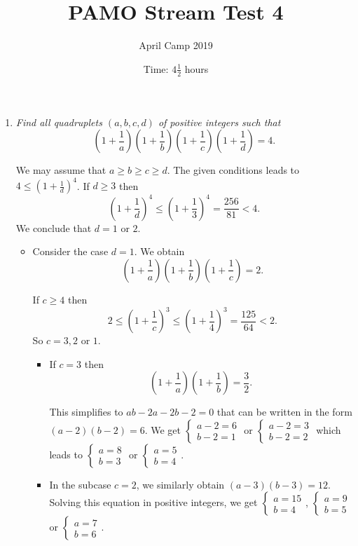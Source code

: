 \documentclass[a4paper, 12pt]{article}
\title{PAMO Stream Test 4}
\author{April Camp 2019}
\date{Time: $4 \frac{1}{2}$ hours}
\begin{document}
 \maketitle

\begin{enumerate}

\item {\itshape Find all quadruplets $(a, b, c, d)$ of positive integers such that
\[
    \left( 1 + \frac{1}{a} \right) \left( 1 + \frac{1}{b} \right) \left( 1 + \frac{1}{c} \right) \left( 1 + \frac{1}{d} \right) = 4.
\]}

We may assume that $a \geq b \geq c \geq d$. The given conditions leads to $4 \leq {\left( 1 + \frac{1}{d} \right)}^4$. If $d \geq 3$ then
\[
    {\left( 1 + \frac{1}{d} \right)}^4 \leq {\left( 1 + \frac{1}{3} \right)}^4 = \frac{256}{81} < 4.
\]
We conclude that $d = 1$ or $2$.

\begin{itemize}

\item Consider the case $d = 1$. We obtain
\[
    \left( 1 + \frac{1}{a} \right) \left( 1 + \frac{1}{b} \right) \left( 1 + \frac{1}{c} \right) = 2.
\]

If $c \geq 4$ then
\[
    2 \leq {\left( 1 + \frac{1}{c} \right)}^3 \leq {\left( 1 + \frac{1}{4} \right)}^3 = \frac{125}{64} < 2.
\]
So $c = 3, 2$ or $1$.
\begin{itemize}

\item If $c = 3$ then
\[
    \left( 1 + \frac{1}{a} \right) \left( 1 + \frac{1}{b} \right) = \frac{3}{2}.
\]

This simplifies to $ab - 2a - 2b - 2 = 0$ that can be written in the form $(a - 2)(b - 2) = 6$. We get $\begin{cases} a - 2 = 6 \\ b - 2 = 1 \end{cases}$ or $\begin{cases} a - 2 = 3 \\ b - 2 = 2 \end{cases}$ which leads to $\begin{cases} a = 8 \\ b = 3 \end{cases}$ or $\begin{cases} a = 5 \\ b = 4 \end{cases}$.

\item In the subcase $c = 2$, we similarly obtain $(a - 3)(b - 3) = 12$. Solving this equation in positive integers, we get $\begin{cases} a = 15 \\ b = 4 \end{cases}$, $\begin{cases} a = 9 \\ b = 5 \end{cases}$ or $\begin{cases} a = 7 \\ b = 6 \end{cases}$.


\end{itemize}
\end{itemize}
\end{enumerate}
\end{document}
